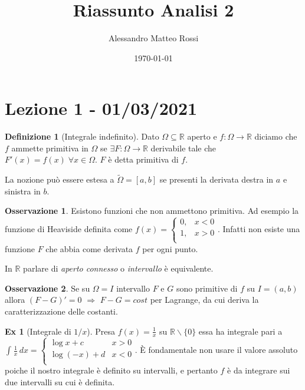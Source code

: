 \documentclass{article}
\title{Riassunto Analisi 2}
\author{Alessandro Matteo Rossi}
\date{\today}
\theoremstyle{definition}
\theoremstyle{definition}
\theoremstyle{definition}
\newtheorem{definition}{Definizione}[section]
\theoremstyle{definition}
\newtheorem{remark}{Osservazione}[section]
\theoremstyle{definition}
\newtheorem{example}{Ex}[section]
\begin{document}
\maketitle
\tableofcontents
\newpage
\section{Lezione 1 - 01/03/2021}


\begin{definition}[Integrale indefinito]
    Dato $\Omega \subseteq \mathbb{R}$ aperto e $f:\Omega \rightarrow \mathbb{R}$ diciamo che $f$ ammette primitiva in $\Omega$ se $\exists F:\Omega \rightarrow \mathbb{R}$ derivabile tale che $F'(x)=f(x) \; \forall x \in \Omega$. $F$ è detta primitiva di $f$.
\end{definition}

La nozione può essere estesa a $\tilde\Omega = [a,b]$ se presenti la derivata destra in $a$ e sinistra in $b$.

\vspace{3mm}

\begin{remark}
    Esistono funzioni che non ammettono primitiva. Ad esempio la funzione di Heaviside definita come $f(x)=
    \begin{cases}
    0, & \text{$x < 0$} \\
    1, & \text{$x > 0$} \\
    \end{cases}$. Infatti non esiste una funzione $F$ che abbia come derivata $f$ per ogni punto.
\end{remark}

\vspace{3mm}

In $\mathbb{R}$ parlare di \textit{aperto connesso} o \textit{intervallo} è equivalente.

\begin{remark}
    Se su $\Omega = I$ intervallo $F$ e $G$ sono primitive di $f$ su $I=(a,b)$ allora $(F-G)'=0$ $\Rightarrow$ $F-G=cost$ per Lagrange, da cui deriva la caratterizzazione delle costanti.
\end{remark}

\begin{example}[Integrale di $1/x$]
    Presa $f(x)=\frac{1}{x}$ su $\mathbb{R} \backslash \lbrace 0 \rbrace$ essa ha integrale pari a 
        $\int_{}^{} \frac{1}{x} \, dx = 
        \begin{cases}
        \log x + c & \text{$x > 0$} \\
        \log (-x) +d  & \text{$x < 0$} \\
        \end{cases}$. 
    È fondamentale non usare il valore assoluto poiche il nostro integrale è definito su intervalli, e pertanto $f$ è da integrare sui due intervalli su cui è definita.
\end{example}
\end{document}
